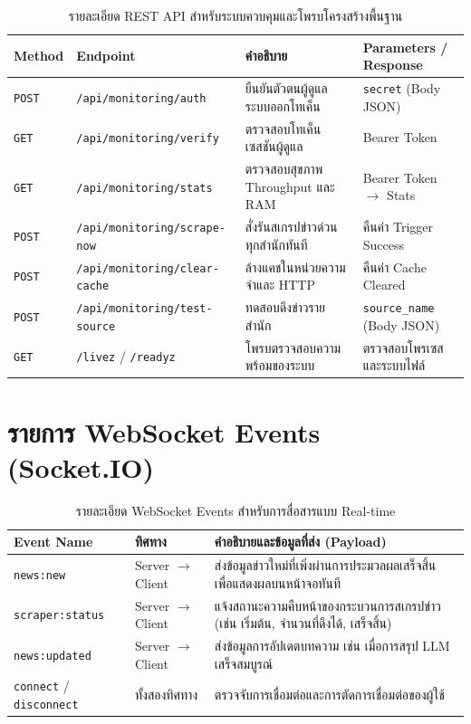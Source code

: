 \begin{table}[H]
\centering
\footnotesize
\caption{รายละเอียด REST API สำหรับระบบควบคุมและโพรบโครงสร้างพื้นฐาน}
\label{tab:api_specs_ops}
\begin{tabular}{|>{\centering\arraybackslash}p{1.1cm}|p{3.5cm}|p{4.4cm}|p{3.5cm}|}
\hline
\textbf{Method} & \textbf{Endpoint} & \textbf{คำอธิบาย} & \textbf{Parameters / Response} \\
\hline
\texttt{POST} & \texttt{/api/monitoring/auth} & ยืนยันตัวตนผู้ดูแลระบบออกโทเค็น & \texttt{secret} (Body JSON) \\ \hline
\texttt{GET} & \texttt{/api/monitoring/verify} & ตรวจสอบโทเค็นเซสชันผู้ดูแล & Bearer Token \\ \hline
\texttt{GET} & \texttt{/api/monitoring/stats} & ตรวจสอบสุขภาพ Throughput และ RAM & Bearer Token $\rightarrow$ Stats \\ \hline
\texttt{POST} & \texttt{/api/monitoring/scrape-now} & สั่งรันสเกรปข่าวด่วนทุกสำนักทันที & คืนค่า Trigger Success \\ \hline
\texttt{POST} & \texttt{/api/monitoring/clear-cache} & ล้างแคชในหน่วยความจำและ HTTP & คืนค่า Cache Cleared \\ \hline
\texttt{POST} & \texttt{/api/monitoring/test-source} & ทดสอบดึงข่าวรายสำนัก & \texttt{source\_name} (Body JSON) \\ \hline
\texttt{GET} & \texttt{/livez} / \texttt{/readyz} & โพรบตรวจสอบความพร้อมของระบบ & ตรวจสอบโพรเซสและระบบไฟล์ \\
\hline
\end{tabular}
\end{table}

\section*{รายการ WebSocket Events (Socket.IO)}

\begin{table}[H]
\centering
\footnotesize
\caption{รายละเอียด WebSocket Events สำหรับการสื่อสารแบบ Real-time}
\label{tab:ws_events}
\begin{tabular}{|>{\centering\arraybackslash}p{2.8cm}|>{\centering\arraybackslash}p{2.2cm}|p{7.5cm}|}
\hline
\textbf{Event Name} & \textbf{ทิศทาง} & \textbf{คำอธิบายและข้อมูลที่ส่ง (Payload)} \\
\hline
\texttt{news:new} & Server $\rightarrow$ Client & ส่งข้อมูลข่าวใหม่ที่เพิ่งผ่านการประมวลผลเสร็จสิ้น เพื่อแสดงผลบนหน้าจอทันที \\ \hline
\texttt{scraper:status} & Server $\rightarrow$ Client & แจ้งสถานะความคืบหน้าของกระบวนการสเกรปข่าว (เช่น เริ่มต้น, จำนวนที่ดึงได้, เสร็จสิ้น) \\ \hline
\texttt{news:updated} & Server $\rightarrow$ Client & ส่งข้อมูลการอัปเดตบทความ เช่น เมื่อการสรุป LLM เสร็จสมบูรณ์ \\ \hline
\texttt{connect} / \texttt{disconnect} & ทั้งสองทิศทาง & ตรวจจับการเชื่อมต่อและการตัดการเชื่อมต่อของผู้ใช้ \\
\hline
\end{tabular}
\end{table}

